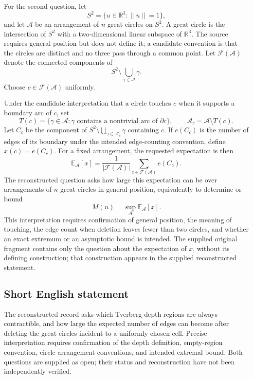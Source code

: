\documentclass[11pt]{article}
\newcommand{\R}{\mathbb{R}}
\newcommand{\E}{\mathbb{E}}
\begin{document}
For the second question, let
\[
S^2=\{u\in\R^3:\|u\|=1\},
\]
and let \(\mathcal A\) be an arrangement of \(n\) great circles on \(S^2\). A great circle is the intersection of \(S^2\) with a two-dimensional linear subspace of \(\R^3\). The source requires general position but does not define it; a candidate convention is that the circles are distinct and no three pass through a common point. Let \(\mathcal F(\mathcal A)\) denote the connected components of
\[
S^2\setminus\bigcup_{\gamma\in\mathcal A}\gamma.
\]
Choose \(c\in\mathcal F(\mathcal A)\) uniformly.

Under the candidate interpretation that a circle touches \(c\) when it supports a boundary arc of \(c\), set
\[
T(c)=\{\gamma\in\mathcal A:\gamma\text{ contains a nontrivial arc of }\partial c\},
\qquad \mathcal A_c=\mathcal A\setminus T(c).
\]
Let \(C_c\) be the component of \(S^2\setminus\bigcup_{\gamma\in\mathcal A_c}\gamma\) containing \(c\). If \(e(C_c)\) is the number of edges of its boundary under the intended edge-counting convention, define \(x(c)=e(C_c)\). For a fixed arrangement, the requested expectation is then
\[
\E_{\mathcal A}[x]=\frac{1}{|\mathcal F(\mathcal A)|}\sum_{c\in\mathcal F(\mathcal A)}e(C_c).
\]
The reconstructed question asks how large this expectation can be over arrangements of \(n\) great circles in general position, equivalently to determine or bound
\[
M(n)=\sup_{\mathcal A}\E_{\mathcal A}[x].
\]
This interpretation requires confirmation of general position, the meaning of touching, the edge count when deletion leaves fewer than two circles, and whether an exact extremum or an asymptotic bound is intended. The supplied original fragment contains only the question about the expectation of \(x\), without its defining construction; that construction appears in the supplied reconstructed statement.
\subsection{Short English statement}
The reconstructed record asks which Tverberg-depth regions are always contractible, and how large the expected number of edges can become after deleting the great circles incident to a uniformly chosen cell. Precise interpretation requires confirmation of the depth definition, empty-region convention, circle-arrangement conventions, and intended extremal bound. Both questions are supplied as open; their status and reconstruction have not been independently verified.
\end{document}
